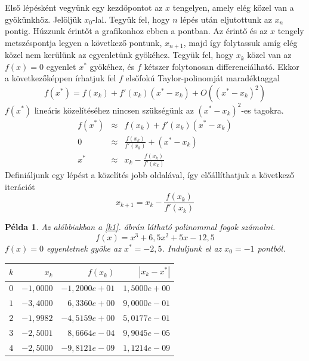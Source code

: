 \documentclass[a4paper,12pt]{report}
\newtheorem{Pl}[Tet]{Példa}
\begin{document}
			Első lépésként vegyünk egy kezdőpontot az $x$ tengelyen, amely elég közel van a gyökünkhöz. Jelöljük $x_0$-lal. Tegyük fel, hogy $n$ lépés után eljutottunk az $x_n$ pontig. Húzzunk érintőt a grafikonhoz ebben a pontban. Az érintő és az $x$ tengely metszéspontja legyen a következő pontunk, $x_{n+1}$, majd így folytassuk amíg elég közel nem kerülünk az egyenletünk gyökéhez. Tegyük fel, hogy $x_k$ közel van az $f(x)=0$ egyenlet $x^*$ gyökéhez, és $f$ kétszer folytonosan differenciálható. Ekkor a következőképpen írhatjuk fel $f$ elsőfokú Taylor-polinomját maradéktaggal
			\[ f(x^*)=f(x_k)+f'(x_k)(x^*-x_{k})+O((x^*-x_{k})^2) \]
			$f(x^*)$ lineáris közelítéséhez nincsen szükségünk az $(x^*-x_{k})^2$-es tagokra.
			\begin{eqnarray*}
				f(x^*)&\approx& f(x_k)+f'(x_k)(x^*-x_{k})\\
				0&\approx&\frac{f(x_k)}{f'(x_k)}+(x^*-x_{k})\\
				x^*&\approx & x_k-\frac{f(x_k)}{f'(x_k)}
			\end{eqnarray*}
			Definiáljunk egy lépést a közelítés jobb oldalával, így előállíthatjuk a következő iterációt
			\begin{equation}
				 \label{e2} x_{k+1}=x_k-\frac{f(x_k)}{f'(x_k)}
			\end{equation}
			\begin{Pl}
				Az alábbiakban a \ref{k1}. ábrán látható polinommal fogok számolni.
				\[f(x)=x^3+6,\!5x^2+5x-12,\!5\]
				$f(x)=0$ egyenletnek gyöke az $x^*=-2,\!5$. Induljunk el az $x_0=-1$ pontból.
				\begin{center}
					\begin{tabular}{|r|r|r|r|}
						\hline
						$k$ & $x_k$     & $f(x_k)$      & $|x_k-x^*|$  \\ \hline
						$0$ & $-1,\!0000$ & $-1,\!2000e+01$ & $1,\!5000e+00$ \\
						$1$ & $-3,\!4000$ & $6,\!3360e+00$  & $9,\!0000e-01$ \\
						$2$ & $-1,\!9982$ & $-4,\!5159e+00$ & $5,\!0177e-01$ \\
						$3$ & $-2,\!5001$ & $8,\!6664e-04$  & $9,\!9045e-05$ \\
						$4$ & $-2,\!5000$ & $-9,\!8121e-09$ & $1,\!1214e-09$ \\
						\hline
					\end{tabular}
				\end{center}
			\end{Pl}
\end{document}
